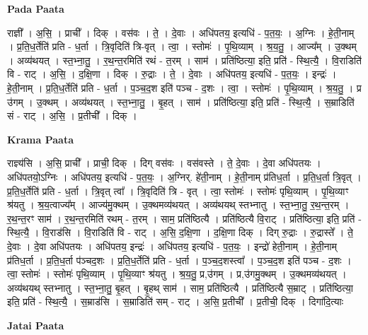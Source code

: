 \documentclass[17pt]{extarticle}
\begin{document}
\textbf{Pada Paata} \newline

राज्ञी᳚ । अ॒सि॒ । प्राची᳚ । दिक् । वस॑वः । ते॒ । दे॒वाः । अधि॑पतय॒ इत्यधि॑ - प॒त॒यः॒ । अ॒ग्निः । हे॒ती॒नाम् । प्र॒ति॒ध॒र्तेति॑ प्रति - ध॒र्ता । त्रि॒वृदिति॑ त्रि-वृत् । त्वा॒ । स्तोमः॑ । पृ॒थि॒व्याम् । श्र॒य॒तु॒ । आज्य᳚म् । उ॒क्थम् । अव्य॑थयत् । स्त॒भ्ना॒तु॒ । र॒थ॒न्त॒रमिति॑ रथं - त॒रम् । साम॑ । प्रति॑ष्ठित्या॒ इति॒ प्रति॑ - स्थि॒त्यै॒ । वि॒राडिति॑ वि - राट् । अ॒सि॒ । द॒क्षि॒णा । दिक् । रु॒द्राः । ते॒ । दे॒वाः । अधि॑पतय॒ इत्यधि॑ - प॒त॒यः॒ । इन्द्रः॑ । हे॒ती॒नाम् । प्र॒ति॒ध॒र्तेति॑ प्रति - ध॒र्ता । प॒ञ्च॒द॒श इति॑ पञ्च - द॒शः । त्वा॒ । स्तोमः॑ । पृ॒थि॒व्याम् । श्र॒य॒तु॒ । प्र उ॑गम् । उ॒क्थम् । अव्य॑थयत् । स्त॒भ्ना॒तु॒ । बृ॒हत् । साम॑ । प्रति॑ष्ठित्या॒ इति॒ प्रति॑ - स्थि॒त्यै॒ । स॒म्राडिति॑ सं - राट् । अ॒सि॒ । प्र॒तीची᳚ । दिक् ।  \newline


\textbf{Krama Paata} \newline

राज्ञ्य॑सि । अ॒सि॒ प्राची᳚ । प्राची॒ दिक् । दिग् वस॑वः । वस॑वस्ते । ते॒ दे॒वाः । दे॒वा अधि॑पतयः । अधि॑पतयो॒ऽग्निः । अधि॑पतय॒ इत्यधि॑ - प॒त॒यः॒ । अ॒ग्निर्. हे॑ती॒नाम् । हे॒ती॒नाम् प्र॑तिध॒र्ता । प्र॒ति॒ध॒र्ता त्रि॒वृत् । प्र॒ति॒ध॒र्तेति॑ प्रति - ध॒र्ता । त्रि॒वृत् त्वा᳚ । त्रि॒वृदिति॑ त्रि - वृत् । त्वा॒ स्तोमः॑ । स्तोमः॑ पृथि॒व्याम् । पृ॒थि॒व्याꣳ श्र॑यतु । श्र॒य॒त्वाज्य᳚म् । आज्य॑मु॒क्थम् । उ॒क्थमव्य॑थयत् । अव्य॑थयथ् स्तभ्नातु । स्त॒भ्ना॒तु॒ र॒थ॒न्त॒रम् । र॒थ॒न्त॒रꣳ साम॑ । र॒थ॒न्त॒रमिति॑ रथम् - त॒रम् । साम॒ प्रति॑ष्ठित्यै । प्रति॑ष्ठित्यै वि॒राट् । प्रति॑ष्ठित्या॒ इति॒ प्रति॑ - स्थि॒त्यै॒ । वि॒राड॑सि । वि॒राडिति॑ वि - राट् । अ॒सि॒ द॒क्षि॒णा । द॒क्षि॒णा दिक् । दिग् रु॒द्राः । रु॒द्रास्ते᳚ । ते॒ दे॒वाः । दे॒वा अधि॑पतयः । अधि॑पतय॒ इन्द्रः॑ । अधि॑पतय॒ इत्यधि॑ - प॒त॒यः॒ । इन्द्रो॑ हेती॒नाम् । हे॒ती॒नाम् प्र॑तिध॒र्ता । प्र॒ति॒ध॒र्ता प॑ञ्चद॒शः । प्र॒ति॒ध॒र्तेति॑ प्रति - ध॒र्ता । प॒ञ्च॒द॒शस्त्वा᳚ । प॒ञ्च॒द॒श इति॑ पञ्च - द॒शः । त्वा॒ स्तोमः॑ । स्तोमः॑ पृथि॒व्याम् । पृ॒थि॒व्याꣳ श्र॑यतु । श्र॒य॒तु॒ प्र,उ॑गम् । प्र,उ॑गमु॒क्थम् । उ॒क्थमव्य॑थयत् । अव्य॑थयथ् स्तभ्नातु । स्त॒भ्ना॒तु॒ बृ॒हत् । बृ॒हथ् साम॑ । साम॒ प्रति॑ष्ठित्यै । प्रति॑ष्ठित्यै स॒म्राट् । प्रति॑ष्ठित्या॒ इति॒ प्रति॑ - स्थि॒त्यै॒ । स॒म्राड॑सि । स॒म्राडिति॑ सम् - राट् । अ॒सि॒ प्र॒तीची᳚ । प्र॒तीची॒ दिक् । दिगा॑दि॒त्याः \newline

\textbf{Jatai Paata} \newline
\end{document}
